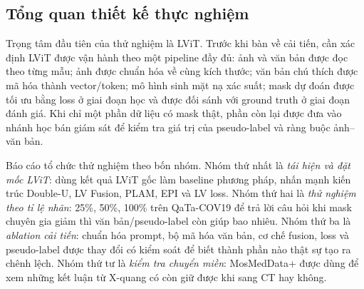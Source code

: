 \subsection{Tổng quan thiết kế thực nghiệm}

Trọng tâm đầu tiên của thử nghiệm là LViT. Trước khi bàn về cải tiến, cần xác định LViT được vận hành theo một pipeline đầy đủ: ảnh và văn bản được đọc theo từng mẫu; ảnh được chuẩn hóa về cùng kích thước; văn bản chú thích được mã hóa thành vector/token; mô hình sinh mặt nạ xác suất; mask dự đoán được tối ưu bằng loss ở giai đoạn học và được đối sánh với ground truth ở giai đoạn đánh giá. Khi chỉ một phần dữ liệu có mask thật, phần còn lại được đưa vào nhánh học bán giám sát để kiểm tra giá trị của pseudo-label và ràng buộc ảnh--văn bản.

Báo cáo tổ chức thử nghiệm theo bốn nhóm. Nhóm thứ nhất là \textit{tái hiện và đặt mốc LViT}: dùng kết quả LViT gốc làm baseline phương pháp, nhấn mạnh kiến trúc Double-U, LV Fusion, PLAM, EPI và LV loss. Nhóm thứ hai là \textit{thử nghiệm theo tỉ lệ nhãn}: 25\%, 50\%, 100\% trên QaTa-COV19 để trả lời câu hỏi khi mask chuyên gia giảm thì văn bản/pseudo-label còn giúp bao nhiêu. Nhóm thứ ba là \textit{ablation cải tiến}: chuẩn hóa prompt, bộ mã hóa văn bản, cơ chế fusion, loss và pseudo-label được thay đổi có kiểm soát để biết thành phần nào thật sự tạo ra chênh lệch. Nhóm thứ tư là \textit{kiểm tra chuyển miền}: MosMedData+ được dùng để xem những kết luận từ X-quang có còn giữ được khi sang CT hay không.

